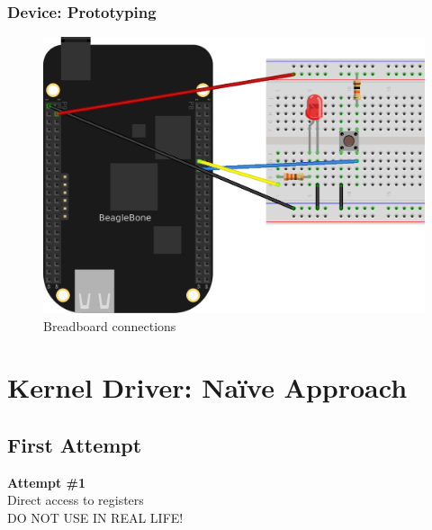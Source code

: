 \begin{frame}
  \frametitle{Device: Prototyping}
    \begin{figure}
      \centering
      \includegraphics[scale=0.7]{images/lab1_bb.png}
      \caption{Breadboard connections}
  \end{figure}
  \vspace*{-12mm}
\end{frame}

\section{Kernel Driver: Na\"ive Approach}

\subsection{First Attempt}

\begin{frame}[standout]
  \textbf{Attempt \#1} \\
  \vspace{5mm}
  Direct access to registers \\
  \vspace{5mm}
  \alert{DO NOT USE IN REAL LIFE!}
\end{frame}

